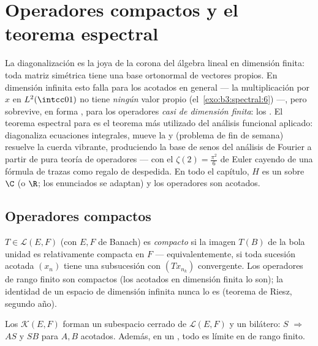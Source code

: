 \chapter{Operadores compactos y el teorema espectral}
\label{ch:b3:spectral}

La diagonalización es la joya de la corona del álgebra lineal en
dimensión finita: toda matriz simétrica tiene una base ortonormal de
vectores propios. En dimensión infinita esto falla para los
 acotados
en general --- la multiplicación por $x$ en $L^2(\intcc01)$ no tiene
\emph{ningún} valor propio (el~\cref{exo:b3:spectral:6}) ---, pero
sobrevive, en forma , para los
operadores \emph{casi de dimensión finita}: los
. El teorema espectral para
 es el teorema más
utilizado del análisis funcional aplicado: diagonaliza ecuaciones
integrales, mueve la  y (problema de fin de semana) resuelve la cuerda vibrante,
produciendo la base de senos del análisis de Fourier a partir de pura
teoría de operadores --- con el $\zeta(2) = \frac{\pi^2}6$ de Euler
cayendo de una fórmula de trazas como regalo de despedida. En todo el
capítulo, $H$ es un 
sobre $\C$ (o $\R$; los enunciados se adaptan) y los operadores son
acotados.

\section{Operadores compactos}

\begin{definition}\label{def:b3:spectral:compact}
$T \in \mathcal L(E, F)$ (con $E, F$ de Banach) es
\emph{compacto} si la imagen $T(B)$ de la bola
unidad es relativamente compacta en $F$ --- equivalentemente, si toda
sucesión acotada $(x_n)$ tiene una subsucesión con $(Tx_{n_k})$
convergente. Los operadores de rango finito son compactos (los acotados
en dimensión finita lo son); la identidad de un espacio de dimensión
infinita nunca lo es (teorema de Riesz, segundo año).
\end{definition}

\begin{proposition}\label{prop:b3:spectral:ideal}
Los 
$\mathcal K(E, F)$ forman un subespacio cerrado de $\mathcal L(E, F)$ y
un  bilátero: $S$
 $\Rightarrow$ $AS$ y $SB$
 para $A, B$ acotados.
Además, en un , todo
 es límite en  de rango finito.
\end{proposition}

